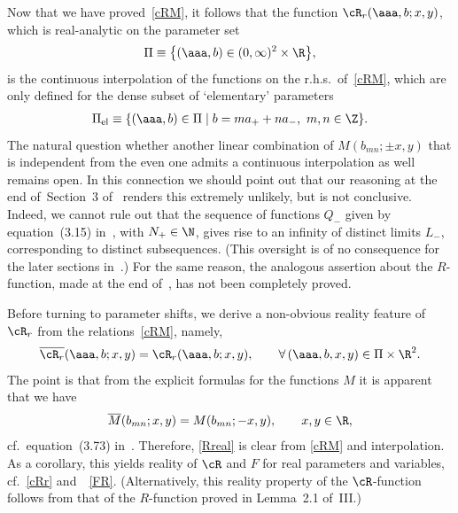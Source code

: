 Now that we have proved~\eqref{cRM},  it follows that the function $\cR_r(\aaa,b;x,y)$, which is real-analytic on the parameter set
\begin{gather}\label{Pi}
\Pi\equiv \big\{(\aaa,b)\in (0,\infty)^2\times\R\big\},
\end{gather}
 is the continuous interpolation of the functions on the r.h.s.\ of~\eqref{cRM}, which are only def\/ined for the dense subset of `elementary' parameters
\begin{gather}\label{elem}
\Pi_{\rm el}\equiv \{ (\aaa,b)\in\Pi \mid b=ma_{+}+na_{-},\ m,n\in\Z\}.
\end{gather}
The natural question whether another linear combination of $M(b_{mn};\pm x,y)$ that is independent from the even one admits a continuous interpolation as well remains open. In this connection we should point out  that our reasoning at the end of~Section~3 of~\cite{koor} renders this extremely unlikely, but is not conclusive. Indeed, we cannot rule out that the sequence of functions $Q_{-}$ given by equation~(3.15) in~\cite{koor}, with $N_{+}\in\N$, gives rise to an inf\/inity of distinct limits $L_{-}$, corresponding to distinct subsequences. (This oversight is of no consequence for the later sections in~\cite{koor}.) For the same reason, the analogous assertion about the $R$-function, made at the end of~\cite{Rsurv}, has not been completely proved.

Before turning to parameter shifts, we derive  a non-obvious reality feature of $\cR_r$ from the  relations~\eqref{cRM}, namely,
\begin{gather}\label{Rreal}
\overline{\cR_r}(\aaa,b;x,y)=\cR_r(\aaa,b;x,y),\qquad \forall\, (\aaa,b,x,y)\in\Pi\times\R^2.
\end{gather}
The point is that from the explicit formulas for the functions $M$ it is apparent that we have
\begin{gather}
\overline{M}(b_{mn};x,y)=M(b_{mn};-x,y), \qquad x,y\in\R,
\end{gather}
cf.~equation~(3.73) in~\cite{GLFII}. Therefore, \eqref{Rreal} is clear from \eqref{cRM} and interpolation. As a corollary, this yields reality of $\cR$ and $F$ for real parameters and variables, cf.~\eqref{cRr} and~~\eqref{FR}. (Alternatively, this reality property of the $\cR$-function follows from that of the $R$-function proved in Lemma~2.1 of~III.)

